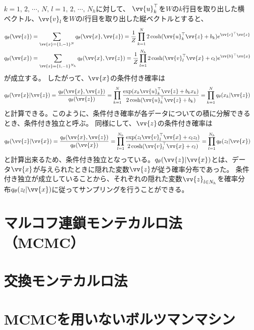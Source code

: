 \documentclass[a4paper,11pt,uplatex]{jsarticle}%
\begin{document}
$k=1,\,2,\,\cdots,\,N,\, l=1,\,2,\,\cdots,\,N_h$に対して、
$\vv{u}_k^{\top}$を$W$の$k$行目を取り出した横ベクトル、$\vv{v}_l$を$W$の$l$行目を取り出した縦ベクトルとすると、
\begin{align}
  q_{\theta}(\vv{z}) & = \sum_{\vv{x}=\{1,-1\}^{N}}q_{\theta}(\vv{x},\vv{z}) = \frac{1}{Z}\prod_{k=1}^{N}2\cosh(\vv{u}_k^{\top}\vv{z}+b_k)e^{\vv{c}^{\top}\vv{z}}     \\
  q_{\theta}(\vv{x}) & = \sum_{\vv{z}=\{1,-1\}^{N_h}}q_{\theta}(\vv{x},\vv{z}) = \frac{1}{Z}\prod_{l=1}^{N_h}2\cosh(\vv{v}_l^{\top}\vv{x}+c_l)e^{\vv{b}^{\top}\vv{x}}
\end{align}
が成立する。
したがって、$\vv{x}$の条件付き確率は
\begin{equation}
  q_{\theta}(\vv{x}|\vv{z}) = \frac{q_{\theta}(\vv{x},\vv{z})}{q_{\theta}(\vv{z})}
  = \prod_{k=1}^{N}\frac{\exp(x_k\vv{u}_k^{\top}\vv{z}+b_kx_k)}{2\cosh(\vv{u}_k^{\top}\vv{z}+b_k)} = \prod_{k=1}^{N}q_{\theta}(x_k|\vv{z})
\end{equation}
と計算できる。このように、条件付き確率が各データについての積に分解できるとき、条件付き独立と呼ぶ。
同様にして、$\vv{z}$の条件付き確率は
\begin{equation}
  q_{\theta}(\vv{z}|\vv{x}) = \frac{q_{\theta}(\vv{x},\vv{z})}{q_{\theta}(\vv{x})}
  = \prod_{l=1}^{N_h}\frac{\exp(z_l\vv{v}_l^{\top}\vv{x}+c_lz_l)}{2\cosh(\vv{v}_l^{\top}\vv{x}+c_l)} = \prod_{l=1}^{N_h}q_{\theta}(z_l|\vv{x})
\end{equation}
と計算出来るため、条件付き独立となっている。$q_{\theta}(\vv{z}|\vv{x})$とは、データ$\vv{x}$が与えられたときに隠れた変数$\vv{z}$が従う確率分布であった。
条件付き独立が成立していることから、それぞれの隠れた変数$\vv{z}_{l\in N_h}$を確率分布$q_{\theta}(z_l|\vv{x})$に従ってサンプリングを行うことができる。




\section{マルコフ連鎖モンテカルロ法（MCMC）}

\section{交換モンテカルロ法}

\section{MCMCを用いないボルツマンマシン}
\end{document}
